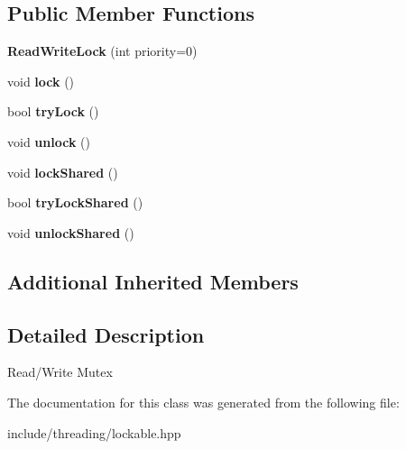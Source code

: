 \subsection*{Public Member Functions}
\begin{DoxyCompactItemize}
\item 
\hypertarget{classcore_1_1threading_1_1_read_write_lock_ad778dfbd3a7b303ad5ab77b28dcc11a7}{{\bfseries Read\-Write\-Lock} (int priority=0)}\label{classcore_1_1threading_1_1_read_write_lock_ad778dfbd3a7b303ad5ab77b28dcc11a7}

\item 
\hypertarget{classcore_1_1threading_1_1_read_write_lock_ace1984ba7bdd0a6d833151c11c553c2c}{void {\bfseries lock} ()}\label{classcore_1_1threading_1_1_read_write_lock_ace1984ba7bdd0a6d833151c11c553c2c}

\item 
\hypertarget{classcore_1_1threading_1_1_read_write_lock_afae7ef81fde0f1135b3f1ea86ed8d071}{bool {\bfseries try\-Lock} ()}\label{classcore_1_1threading_1_1_read_write_lock_afae7ef81fde0f1135b3f1ea86ed8d071}

\item 
\hypertarget{classcore_1_1threading_1_1_read_write_lock_a984ea70b333e06eedc368eb08ffd5eff}{void {\bfseries unlock} ()}\label{classcore_1_1threading_1_1_read_write_lock_a984ea70b333e06eedc368eb08ffd5eff}

\item 
\hypertarget{classcore_1_1threading_1_1_read_write_lock_aacc5dcdc9a47ffa5a13007b620ffc0ba}{void {\bfseries lock\-Shared} ()}\label{classcore_1_1threading_1_1_read_write_lock_aacc5dcdc9a47ffa5a13007b620ffc0ba}

\item 
\hypertarget{classcore_1_1threading_1_1_read_write_lock_af870867aca18e4159b17ab42c134dc4f}{bool {\bfseries try\-Lock\-Shared} ()}\label{classcore_1_1threading_1_1_read_write_lock_af870867aca18e4159b17ab42c134dc4f}

\item 
\hypertarget{classcore_1_1threading_1_1_read_write_lock_a5538e6695f896c843701c615a0ccf134}{void {\bfseries unlock\-Shared} ()}\label{classcore_1_1threading_1_1_read_write_lock_a5538e6695f896c843701c615a0ccf134}

\end{DoxyCompactItemize}
\subsection*{Additional Inherited Members}


\subsection{Detailed Description}
Read/\-Write Mutex 

The documentation for this class was generated from the following file\-:\begin{DoxyCompactItemize}
\item 
include/threading/lockable.\-hpp\end{DoxyCompactItemize}
